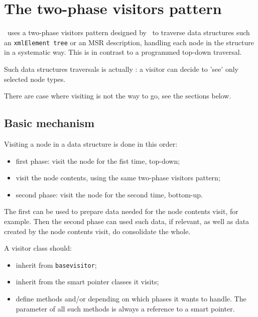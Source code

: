
\chapter{The two-phase visitors pattern}\label{The two-phase visitors pattern}

\mf\ uses a two-phase visitors pattern designed by \fober\ to traverse data structures such an {\tt xmlElement tree} or an MSR description, handling each node in the structure in a systematic way. This is in contrast to a programmed top-down traversal.

Such data structures traversals is actually : a visitor can decide to 'see' only selected node types.

There are case where visiting is not the way to go, see the sections below.


\section{Basic mechanism}

Visiting a node in a data structure is done in this order:
\begin{itemize}
\item first phase: visit the node for the fist time, top-down;
\item visit the node contents, using the same two-phase visitors pattern;
\item second phase: visit the node for the second time, bottom-up.
\end{itemize}

The first can be used to prepare data needed for the node contents visit, for example.
Then the second phase can used such data, if relevant, as well as data created by the node contents visit, do consolidate the whole.

A visitor class   should:
\begin{itemize}
\item inherit from {\tt basevisitor};
\item inherit from the smart pointer classes it visits;
\item define methods  and/or  depending on which phases it wants to handle. The parameter of all such  methods is always a reference to a smart pointer.
\end{itemize}

